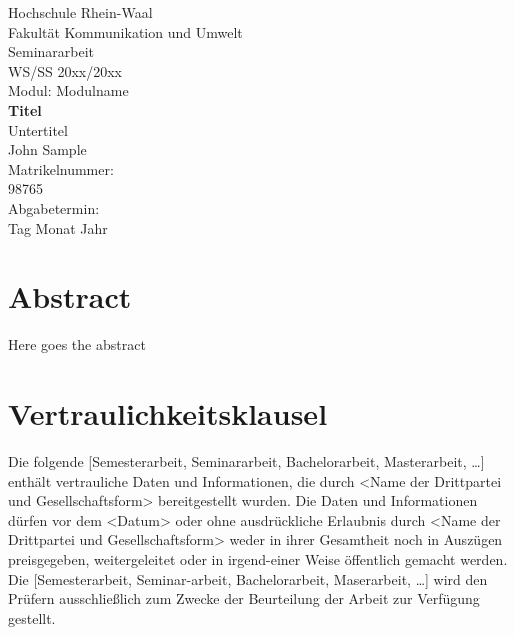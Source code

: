 \documentclass[11pt,a4paper]{scrreprt}
\begin{document}
\begin{titlepage}
\begin{center}
\fontsize{16pt}{16pt}\selectfont Hochschule Rhein-Waal\\
Fakultät Kommunikation und Umwelt\\
\vspace{2cm}
Seminararbeit\\
WS/SS 20xx/20xx\\
Modul: Modulname\\
\vspace{2cm}
\fontsize{22pt}{22pt}\selectfont\textbf{Titel}\\
\fontsize{20pt}{20pt}\selectfont Untertitel\\
\vspace{8cm}
John Sample\\
\vspace{2cm}
Matrikelnummer:\\
98765\\
\vspace{2cm}
Abgabetermin:\\
Tag Monat Jahr
\end{center}
\end{titlepage}

\setcounter{page}{2}


\chapter*{Abstract}
\thispagestyle{scrheadings}
Here goes the abstract

\chapter*{Vertraulichkeitsklausel}
\thispagestyle{scrheadings}
Die folgende [Semesterarbeit, Seminararbeit, Bachelorarbeit, Masterarbeit, …] enthält vertrauliche Daten und Informationen, die durch <Name der Drittpartei und Gesellschaftsform> bereitgestellt wurden. Die Daten und Informationen dürfen vor dem <Datum> oder ohne ausdrückliche Erlaubnis durch <Name der Drittpartei und Gesellschaftsform> weder in ihrer Gesamtheit noch in Auszügen preisgegeben, weitergeleitet oder in irgend-einer Weise öffentlich gemacht werden. Die [Semesterarbeit, Seminar-arbeit, Bachelorarbeit, Maserarbeit, …] wird den Prüfern ausschließlich zum Zwecke der Beurteilung der Arbeit zur Verfügung gestellt.

\tableofcontents
\thispagestyle{scrheadings}
\end{document}
